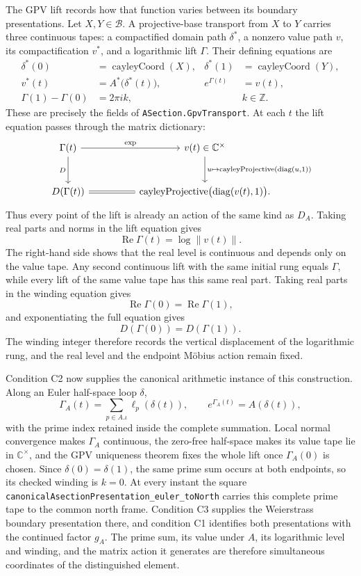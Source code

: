 \documentclass[11pt]{article}
\newcommand{\CC}{\mathbb{C}}
\newcommand{\ZZ}{\mathbb{Z}}
\theoremstyle{plain}
\theoremstyle{definition}
\theoremstyle{remark}
\begin{document}
\begin{tcolorbox}
The GPV lift records how that function varies between its boundary presentations. Let
$X,Y\in\mathcal B$. A projective-base transport from $X$ to $Y$ carries three continuous tapes:
a compactified domain path $\delta^*$, a nonzero value path $v$, its compactification $v^*$,
and a logarithmic lift $\Gamma$.
Their defining equations are
\[
\begin{aligned}
 \delta^*(0)&=\operatorname{cayleyCoord}(X),
 &\delta^*(1)&=\operatorname{cayleyCoord}(Y),\\
 v^*(t)&=A^*\bigl(\delta^*(t)\bigr),
 &e^{\Gamma(t)}&=v(t),\\
 \Gamma(1)-\Gamma(0)&=2\pi i k,
 &&k\in\ZZ.
\end{aligned}
\]
These are precisely the fields of \texttt{ASection.GpvTransport}. At each $t$ the lift equation
passes through the matrix dictionary:
\[
\begin{tikzcd}[column sep=huge,row sep=large]
\Gamma(t) \arrow[r,"\exp"] \arrow[d,"D"'] &
v(t)\in\CC^\times
  \arrow[d,"{u\mapsto\operatorname{cayleyProjective}(\operatorname{diag}(u,1))}"]\\
D(\Gamma(t)) \arrow[r,equal] &
\operatorname{cayleyProjective}\bigl(\operatorname{diag}(v(t),1)\bigr).
\end{tikzcd}
\]
Thus every point of the lift is already an action of the same kind as $D_A$. Taking real parts
and norms in the lift equation gives
\[
  \operatorname{Re}\Gamma(t)=\log\lVert v(t)\rVert.
\]
The right-hand side shows that the real level is continuous and depends only on the value tape.
Any second continuous lift with the same initial rung equals $\Gamma$, while every lift of the
same value tape has this same real part. Taking real parts in the winding equation gives
\[
  \operatorname{Re}\Gamma(0)=\operatorname{Re}\Gamma(1),
\]
and exponentiating the full equation gives
\[
  D(\Gamma(0))=D(\Gamma(1)).
\]
The winding integer therefore records the vertical displacement of the logarithmic rung, and the
real level and the endpoint M\"obius action remain fixed.

Condition \textup{C2} now supplies the canonical arithmetic instance of this construction. Along
an Euler half-space loop $\delta$,
\[
  \Gamma_A(t)=\sum_{p\in A.\iota}\ell_p(\delta(t)),
  \qquad e^{\Gamma_A(t)}=A(\delta(t)),
\]
with the prime index retained inside the complete summation. Local normal convergence makes
$\Gamma_A$ continuous, the zero-free half-space makes its value tape lie in $\CC^\times$, and the
GPV uniqueness theorem fixes the whole lift once $\Gamma_A(0)$ is chosen. Since $\delta(0)=
\delta(1)$, the same prime sum occurs at both endpoints, so its checked winding is $k=0$. At every
instant the square \texttt{canonicalAsectionPresentation\_euler\_toNorth} carries this complete
prime tape to the common north frame. Condition \textup{C3} supplies the Weierstrass boundary
presentation there, and condition \textup{C1} identifies both presentations with the continued
factor $g_A$. The prime sum, its value under $A$, its logarithmic level and winding, and the matrix
action it generates are therefore simultaneous coordinates of the distinguished element.


\end{tcolorbox}
\end{document}
